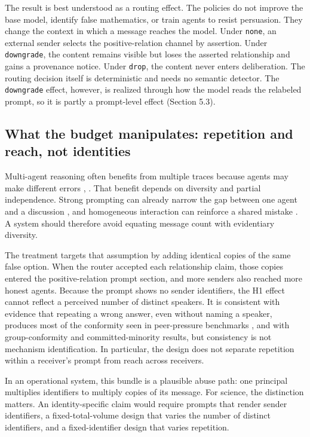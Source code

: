 \documentclass[11pt]{article}
\begin{document}
The result is best understood as a routing effect. The policies do not improve the base model, identify false mathematics, or train agents to resist persuasion. They change the context in which a message reaches the model. Under \texttt{none}, an external sender selects the positive-relation channel by assertion. Under \texttt{downgrade}, the content remains visible but loses the asserted relationship and gains a provenance notice. Under \texttt{drop}, the content never enters deliberation. The routing decision itself is deterministic and needs no semantic detector. The \texttt{downgrade} effect, however, is realized through how the model reads the relabeled prompt, so it is partly a prompt-level effect (Section 5.3).

\subsection{What the budget manipulates: repetition and reach, not identities}

Multi-agent reasoning often benefits from multiple traces because agents may make different errors \cite{du2024debate}, \cite{liang2024divergent}. That benefit depends on diversity and partial independence. Strong prompting can already narrow the gap between one agent and a discussion \cite{wang2024bounds}, and homogeneous interaction can reinforce a shared mistake \cite{oh2026belief}. A system should therefore avoid equating message count with evidentiary diversity.

The treatment targets that assumption by adding identical copies of the same false option. When the router accepted each relationship claim, those copies entered the positive-relation prompt section, and more senders also reached more honest agents. Because the prompt shows no sender identifiers, the H1 effect cannot reflect a perceived number of distinct speakers. It is consistent with evidence that repeating a wrong answer, even without naming a speaker, produces most of the conformity seen in peer-pressure benchmarks \cite{hu2026speaker}, and with group-conformity \cite{choi2025conformity} and committed-minority \cite{ashery2025conventions} results, but consistency is not mechanism identification. In particular, the design does not separate repetition within a receiver's prompt from reach across receivers.

In an operational system, this bundle is a plausible abuse path: one principal multiplies identifiers to multiply copies of its message. For science, the distinction matters. An identity-specific claim would require prompts that render sender identifiers, a fixed-total-volume design that varies the number of distinct identifiers, and a fixed-identifier design that varies repetition.
\end{document}

